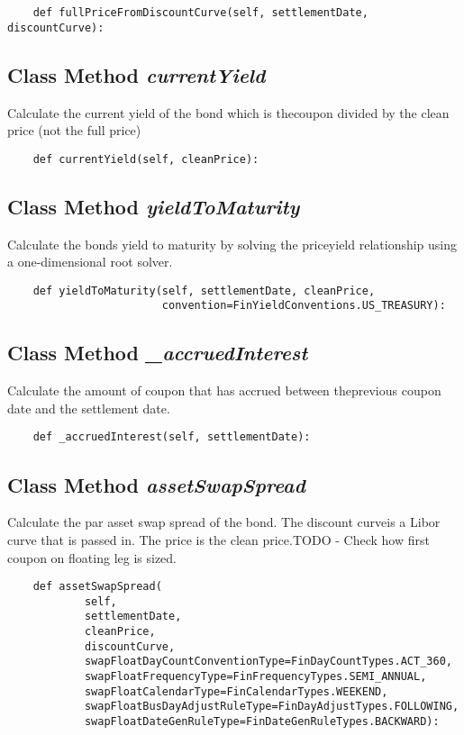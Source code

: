 \documentclass[twoside,11pt]{book}
\begin{document}
\begin{lstlisting}
    def fullPriceFromDiscountCurve(self, settlementDate, discountCurve):
\end{lstlisting}

\subsection{Class Method {\it currentYield}}
Calculate the current yield of the bond which is thecoupon divided by the clean price (not the full price)

\begin{lstlisting}
    def currentYield(self, cleanPrice):
\end{lstlisting}

\subsection{Class Method {\it yieldToMaturity}}
Calculate the bonds yield to maturity by solving the priceyield relationship using a one-dimensional root solver. 

\begin{lstlisting}
    def yieldToMaturity(self, settlementDate, cleanPrice,
                        convention=FinYieldConventions.US_TREASURY):
\end{lstlisting}

\subsection{Class Method {\it \_accruedInterest}}
Calculate the amount of coupon that has accrued between theprevious coupon date and the settlement date. 

\begin{lstlisting}
    def _accruedInterest(self, settlementDate):
\end{lstlisting}

\subsection{Class Method {\it assetSwapSpread}}
Calculate the par asset swap spread of the bond. The discount curveis a Libor curve that is passed in. The price is the clean price.TODO - Check how first coupon on floating leg is sized. 

\begin{lstlisting}
    def assetSwapSpread(
            self,
            settlementDate,
            cleanPrice,
            discountCurve,
            swapFloatDayCountConventionType=FinDayCountTypes.ACT_360,
            swapFloatFrequencyType=FinFrequencyTypes.SEMI_ANNUAL,
            swapFloatCalendarType=FinCalendarTypes.WEEKEND,
            swapFloatBusDayAdjustRuleType=FinDayAdjustTypes.FOLLOWING,
            swapFloatDateGenRuleType=FinDateGenRuleTypes.BACKWARD):
\end{lstlisting}
\end{document}
